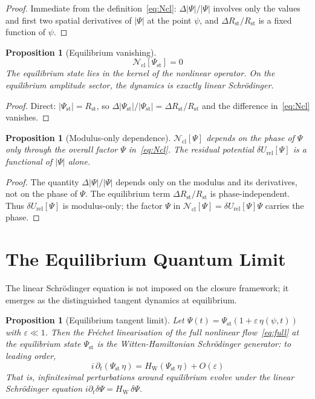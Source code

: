 \documentclass[12pt]{article}
\newtheorem{proposition}[theorem]{Proposition}
\newcommand{\Ncl}{\mathcal{N}_{\mathrm{cl}}}
\newcommand{\HW}{H_{\mathrm{W}}}
\newcommand{\Rst}{R_{\mathrm{st}}}
\newcommand{\dUrel}{\delta U_{\mathrm{rel}}}
\begin{document}
\begin{proof}
Immediate from the definition~\eqref{eq:Ncl}: $\Delta|\Psi|/|\Psi|$ involves only the values and first two spatial derivatives of $|\Psi|$ at the point $\psi$, and $\Delta\Rst/\Rst$ is a fixed function of $\psi$.
\end{proof}

\begin{proposition}[Equilibrium vanishing]\label{prop:vanishing}
\begin{equation}
    \Ncl[\Psi_{\mathrm{st}}] = 0
\end{equation}
The equilibrium state lies in the kernel of the nonlinear operator. On the equilibrium amplitude sector, the dynamics is exactly linear Schr\"odinger.
\end{proposition}

\begin{proof}
Direct: $|\Psi_{\mathrm{st}}| = \Rst$, so $\Delta|\Psi_{\mathrm{st}}|/|\Psi_{\mathrm{st}}| = \Delta\Rst/\Rst$ and the difference in~\eqref{eq:Ncl} vanishes.
\end{proof}

\begin{proposition}[Modulus-only dependence]\label{prop:modulus}
$\Ncl[\Psi]$ depends on the phase of $\Psi$ only through the overall factor $\Psi$ in~\eqref{eq:Ncl}. The residual potential $\dUrel[\Psi]$ is a functional of $|\Psi|$ alone.
\end{proposition}

\begin{proof}
The quantity $\Delta|\Psi|/|\Psi|$ depends only on the modulus and its derivatives, not on the phase of $\Psi$. The equilibrium term $\Delta\Rst/\Rst$ is phase-independent. Thus $\dUrel[\Psi]$ is modulus-only; the factor $\Psi$ in $\Ncl[\Psi] = \dUrel[\Psi]\Psi$ carries the phase.
\end{proof}

\section{The Equilibrium Quantum Limit}\label{sec:limit}

The linear Schr\"odinger equation is not imposed on the closure framework; it emerges as the distinguished tangent dynamics at equilibrium.

\begin{proposition}[Equilibrium tangent limit]\label{prop:tangent}
Let $\Psi(t) = \Psi_{\mathrm{st}}(1 + \varepsilon\,\eta(\psi,t))$ with $\varepsilon \ll 1$. Then the Fr\'echet linearisation of the full nonlinear flow~\eqref{eq:full} at the equilibrium state $\Psi_{\mathrm{st}}$ is the Witten-Hamiltonian Schr\"odinger generator: to leading order,
\begin{equation}
    i\,\partial_t(\Psi_{\mathrm{st}}\,\eta) = \HW(\Psi_{\mathrm{st}}\,\eta) + O(\varepsilon)
\end{equation}
That is, infinitesimal perturbations around equilibrium evolve under the linear Schr\"odinger equation $i\partial_t\delta\Psi = \HW\,\delta\Psi$.
\end{proposition}
\end{document}
